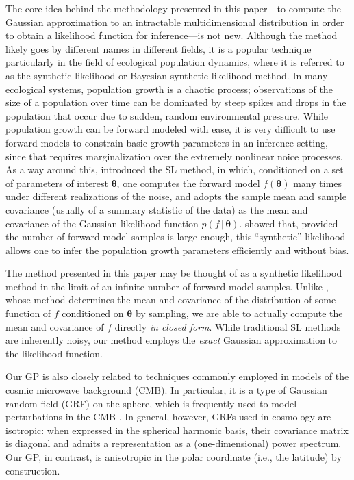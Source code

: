 \documentclass[modern,linenumbers]{aastex62}
\begin{document}
The core idea behind the methodology presented in this paper---to compute the
Gaussian approximation to an intractable multidimensional distribution in order
to obtain a likelihood function for inference---is not new. Although the
method likely goes by different names in different fields, it is a popular
technique particularly in the field of ecological population dynamics,
where it is referred to as the synthetic likelihood \citep[SL;][]{Wood2010}
or Bayesian synthetic likelihood \citep[BSL;][]{Price2018} method. In many
ecological systems, population growth is a chaotic process; observations of the
size of a population over time can be dominated by steep spikes and drops
in the population that occur due to sudden, random environmental pressure.
While population growth can be forward modeled with ease, it is very
difficult to use forward models to constrain basic growth parameters in an
inference setting, since that requires marginalization over the extremely
nonlinear noice processes. As a way around this, \citet{Wood2010} introduced
the SL method, in which, conditioned on a set of parameters of interest
$\pmb{\theta}$, one computes the forward model $f(\pmb{\theta})$ many times
under different realizations of the noise, and adopts the sample mean
and sample covariance (usually of a summary statistic of the data)
as the mean and covariance of the Gaussian likelihood
function $p(f \, | \, \pmb{\theta})$. \citet{Wood2010} showed that,
provided the number of forward model samples is large enough, this
``synthetic'' likelihood allows one to infer the population growth parameters
efficiently and without bias.

The method presented in this paper may be thought of as a synthetic likelihood
method in the limit of an infinite number of forward model samples. Unlike
\citet{Wood2010}, whose method determines the mean and covariance of the
distribution of some function of $f$ conditioned on $\pmb{\theta}$ by sampling, we are able
to actually compute the mean and covariance of $f$ directly \emph{in closed form}.
While traditional SL methods are inherently noisy, our method employs
the \emph{exact} Gaussian approximation to the likelihood function.

Our GP is also closely related to techniques commonly employed in models
of the cosmic microwave background (CMB). In particular, it is a type of
Gaussian random field (GRF) on the sphere, which is frequently used to
model perturbations in the CMB \citep{Wandelt2012}. In general, however,
GRFs used in cosmology are isotropic: when expressed in the spherical
harmonic basis, their covariance matrix is diagonal and admits a
representation as a (one-dimensional) power spectrum. Our GP, in contrast,
is anisotropic in
the polar coordinate (i.e., the latitude) by construction.
\end{document}
